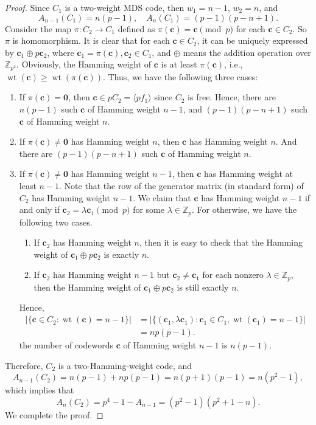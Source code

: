 \documentclass[12pt,reqno]{amsart}
\DeclareMathOperator{\wt}{wt}
\renewcommand{\vec}[1]{\boldsymbol{#1}} %
\begin{document}
\begin{proof}
	Since $C_1$ is a two-weight MDS code, then $w_1 = n-1$, $w_2 = n$, and
	\[ A_{n-1}(C_1) = n(p-1), \quad A_n(C_1) = (p-1)(p-n+1). \]
	Consider the map $\pi: C_2 \rightarrow C_1$ defined as $\pi(\vec{c}) = \vec{c} \pmod{p}$ for each $\vec{c} \in C_2$.
	So $\pi$ is homomorphism.
	It is clear that for each $\vec{c} \in C_2$, it can be uniquely expressed by $\vec{c}_1 \oplus p \vec{c}_2$, where $\vec{c}_1 = \pi(\vec{c}),\vec{c}_2 \in C_1$, and $\oplus$ means the addition operation over $\mathbb{Z}_{p^2}$.
	Obviously, the Hamming weight of $\vec{c}$ is at least $\pi(\vec{c})$, i.e., $\wt(\vec{c}) \geqslant \wt(\pi(\vec{c}))$.
	Thus, we have the following three cases:
	\begin{enumerate}
		\item[(1)] If $\pi(\vec{c}) = \vec{0}$, then $\vec{c} \in pC_2 = \langle pf_1 \rangle$ since $C_2$ is free.
		Hence, there are $n(p-1)$ such $\vec{c}$ of Hamming weight $n-1$, and $(p-1)(p-n+1)$ such $\vec{c}$ of Hamming weight $n$.
		
		\item[(2)] If $\pi(\vec{c}) \neq \vec{0}$ has Hamming weight $n$, then $\vec{c}$ has Hamming weight $n$.
		And there are $(p-1)(p-n+1)$ such $\vec{c}$ of Hamming weight $n$.
		
		\item[(3)] If $\pi(\vec{c}) \neq \vec{0}$ has Hamming weight $n-1$, then $\vec{c}$ has Hamming weight at least $n-1$.
		Note that the row of the generator matrix (in standard form) of $C_2$ has Hamming weight $n-1$.
		We claim that $\vec{c}$ has Hamming weight $n-1$ if and only if $\vec{c}_2 = \lambda \vec{c}_1 \pmod{p}$ for some $\lambda \in \mathbb{Z}_p$.
		For otherwise, we have the following two cases.
		\begin{enumerate}
			\item If $\vec{c}_2$ has Hamming weight $n$, then it is easy to check that the Hamming weight of $\vec{c}_1 \oplus p \vec{c}_2$ is exactly $n$.
			
			\item If $\vec{c}_2$ has Hamming weight $n-1$ but $\vec{c}_2 \neq \vec{c}_1$ for each nonzero $\lambda \in \mathbb{Z}_p$, then the Hamming weight of $\vec{c}_1 \oplus p \vec{c}_2$ is still exactly $n$.
		\end{enumerate}
		Hence,
		\begin{align*}
			|\{ \vec{c} \in C_2: \wt(\vec{c}) = n-1 \}| & = |\{ (\vec{c}_1, \lambda \vec{c}_1): \vec{c}_1 \in C_1, \wt(\vec{c}_1) = n-1 \}| \\
			& = np(p-1).
		\end{align*}
		the number of codewords $\vec{c}$ of Hamming weight $n-1$ is $n(p-1)$.
	\end{enumerate}
	Therefore, $C_2$ is a two-Hamming-weight code, and
	\[ A_{n-1}(C_2) = n(p-1) + np(p-1) = n(p+1)(p-1) = n(p^2 - 1), \]
	which implies that
	\[ A_{n}(C_2) = p^4 - 1 - A_{n-1} = (p^2 - 1)(p^2 + 1 - n). \]
	We complete the proof.
\end{proof}
\end{document}

